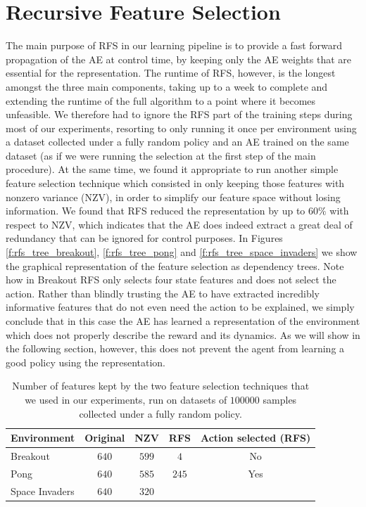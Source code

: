 \section{Recursive Feature Selection}
The main purpose of RFS in our learning pipeline is to provide a fast forward 
propagation of the AE at control time, by keeping only the AE weights that are 
essential for the representation. 
The runtime of RFS, however, is the longest amongst the three main components, 
taking up to a week to complete and extending the runtime of the full algorithm
to a point where it becomes unfeasible. We therefore had to ignore the RFS 
part of the training steps during most of our experiments, resorting to only
running it once per environment using a dataset collected under a fully random 
policy and an AE trained on the same dataset (as if we were running the 
selection at the first step of the main procedure). 
At the same time, we found it appropriate to run another simple feature 
selection technique which consisted in only keeping those features with nonzero 
variance (NZV), in order to simplify our feature space without losing 
information. 
We found that RFS reduced the representation by up to $60\%$ with respect to NZV,
which indicates that the AE does indeed extract a great deal of redundancy that
can be ignored for control purposes. 
In Figures \ref{f:rfs_tree_breakout}, \ref{f:rfs_tree_pong} and 
\ref{f:rfs_tree_space_invaders} we show the graphical representation of the 
feature selection as dependency trees.
Note how in Breakout RFS only selects four state features and does not select
the action. Rather than blindly trusting the AE to have extracted incredibly 
informative features that do not even need the action to be explained, we 
simply conclude that in this case the AE has learned a representation of the 
environment which does not properly describe the reward and its dynamics. 
As we will show in the following section, however, this does not prevent the 
agent from learning a good policy using the representation.
%
\begin{table}
    \centering
    \begin{tabular}{l c c c c} 
	\hline
	Environment    & Original & NZV   & RFS   & Action selected (RFS) \\ 
	\hline 
	Breakout       & $640$    & $599$ & $4$   & No\\
	Pong           & $640$    & $585$ & $245$ & Yes\\
	Space Invaders & $640$    & $320$ & $ $   & \\
	\hline
    \end{tabular}
    \caption[Feature selection results]{Number of features kept by the two 
	     feature selection techniques that we used in our experiments, run 
	     on datasets of $100000$ samples collected under a fully random 
	     policy.}
    \label{t:RFS_results}
\end{table}
